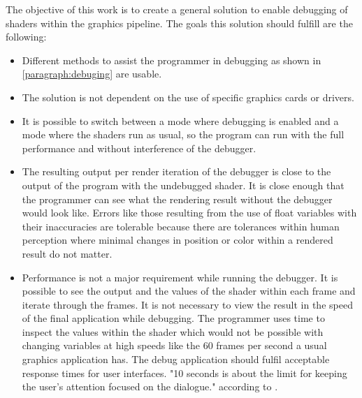The objective of this work is to create a general solution to enable debugging of shaders within the graphics pipeline. The goals this solution should fulfill are the following:

\begin{itemize}
	\item Different methods to assist the programmer in debugging as shown in \autoref{paragraph:debuging} are usable.
	\item The solution is not dependent on the use of specific graphics cards or drivers.
	\item It is possible to switch between a mode where debugging is enabled and a mode where the shaders run as usual, so the program can run with the full performance and without interference of the debugger.
	\item The resulting output per render iteration of the debugger is close to the output of the program with the undebugged shader. It is close enough that the programmer can see what the rendering result without the debugger would look like. Errors like those resulting from the use of float variables with their inaccuracies are tolerable because there are tolerances within human perception where minimal changes in position or color within a rendered result do not matter.
	\item Performance is not a major requirement while running the debugger. It is possible to see the output and the values of the shader within each frame and iterate through the frames. It is not necessary to view the result in the speed of the final application while debugging. The programmer uses time to inspect the values within the shader which would not be possible with changing variables at high speeds like the 60 frames per second a usual graphics application has. The debug application should fulfil acceptable response times for user interfaces. "10 seconds is about the limit for keeping the user's attention focused on the dialogue." according to .
\end{itemize}




